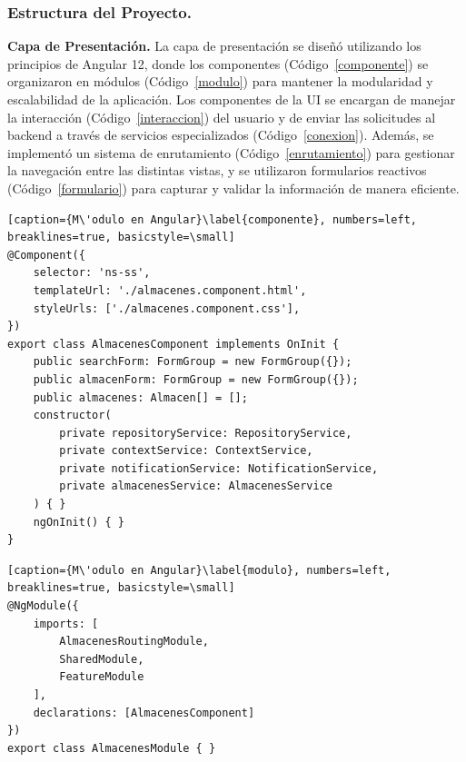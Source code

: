 \documentclass[stu, 12pt, letterpaper, donotrepeattitle, floatsintext, natbib]{apa7}
\begin{document}
\subsubsection{Estructura del Proyecto.}
\textbf{Capa de Presentaci\'on. }La capa de presentaci\'on se dise\~{n}\'o utilizando los principios de Angular 12, donde los componentes (C\'odigo~\ref{componente}) se organizaron en m\'odulos (C\'odigo~\ref{modulo}) para mantener la modularidad y escalabilidad de la aplicaci\'on. Los componentes de la UI se encargan de manejar la interacci\'on (C\'odigo~\ref{interaccion}) del usuario y de enviar las solicitudes al backend a trav\'es de servicios especializados (C\'odigo~\ref{conexion}). Adem\'as, se implement\'o un sistema de enrutamiento (C\'odigo~\ref{enrutamiento}) para gestionar la navegaci\'on entre las distintas vistas, y se utilizaron formularios reactivos (C\'odigo~\ref{formulario}) para capturar y validar la informaci\'on de manera eficiente.
\begin{lstlisting}[caption={M\'odulo en Angular}\label{componente}, numbers=left, breaklines=true, basicstyle=\small]
@Component({
    selector: 'ns-ss',
    templateUrl: './almacenes.component.html',
    styleUrls: ['./almacenes.component.css'],
})
export class AlmacenesComponent implements OnInit {
    public searchForm: FormGroup = new FormGroup({});
    public almacenForm: FormGroup = new FormGroup({});
    public almacenes: Almacen[] = [];
    constructor(
        private repositoryService: RepositoryService,
        private contextService: ContextService,
        private notificationService: NotificationService,
        private almacenesService: AlmacenesService
    ) { }
    ngOnInit() { }
}
\end{lstlisting}
\begin{lstlisting}[caption={M\'odulo en Angular}\label{modulo}, numbers=left, breaklines=true, basicstyle=\small]
@NgModule({
    imports: [
        AlmacenesRoutingModule,
        SharedModule,
        FeatureModule
    ],
    declarations: [AlmacenesComponent]
})
export class AlmacenesModule { }
\end{lstlisting}
\end{document}
